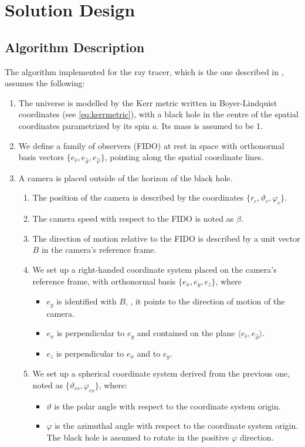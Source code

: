 \chapter{Solution Design}

\section{Algorithm Description}

The algorithm implemented for the ray tracer, which is the one described in \cite{thorne15}, assumes the following:
\begin{enumerate}
	\item The universe is modelled by the Kerr metric written in Boyer-Lindquist coordinates (see \autoref{eq:kerrmetric}), with a black hole in the centre of the spatial coordinates parametrized by its spin $a$. Its mass is assumed to be 1.
	\item We define a family of observers (FIDO) at rest in space with orthonormal basis vectors $\{e_{\widehat{r}}, e_{\widehat{\vartheta}}, e_{\widehat{\varphi}}\}$, pointing along the spatial coordinate lines.
	\item A camera is placed outside of the horizon of the black hole.
	\begin{enumerate}
		\item The position of the camera is described by the coordinates $\{r_c, \vartheta_c, \varphi_c\}$.
		\item The camera speed with respect to the FIDO is noted as $\beta$.
		\item The direction of motion relative to the FIDO is described by a unit vector $B$ in the camera's reference frame.
		\item We set up a right-handed coordinate system placed on the camera's reference frame, with orthonormal basis $\{e_x, e_y, e_z\}$, where
		\begin{itemize}
			\item $e_y$ is identified with $B$, \ie, it points to the direction of motion of the camera.
			\item $e_x$ is perpendicular to $e_y$ and contained on the plane $\langle e_{\widehat{r}}, e_{\widehat{\vartheta}} \rangle$.
			\item $e_z$ is perpendicular to $e_x$ and to $e_y$.
		\end{itemize}
		\item We set up a spherical coordinate system derived from the previous one, noted as $\{\vartheta_{cs}, \varphi_{cs}\}$, where:
		\begin{itemize}
			\item $\vartheta$ is the polar angle with respect to the coordinate system origin.
			\item $\varphi$ is the azimuthal angle with respect to the coordinate system origin. The black hole is assumed to rotate in the positive $\varphi$ direction.
		\end{itemize}
	\end{enumerate}
\end{enumerate}

